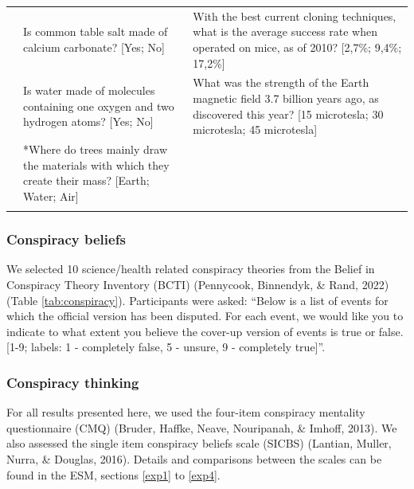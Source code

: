 \documentclass[
  doc,floatsintext]{apa6}
\begin{document}
\begin{longtable}[t]{>{\raggedleft\arraybackslash}p{2em}>{\raggedright\arraybackslash}p{22em}>{\raggedright\arraybackslash}p{22em}}
9 & Is common table salt made of calcium carbonate? [Yes; No] & With the best current cloning techniques, what is the average success rate when operated on mice, as of 2010? [2,7\%; 9,4\%; 17,2\%]\\
10 & Is water made of molecules containing one oxygen and two hydrogen atoms? [Yes; No] & What was the strength of the Earth magnetic field 3.7 billion years ago, as discovered this year? [15 microtesla; 30 microtesla; 45 microtesla]\\
\addlinespace
11 & *Where do trees mainly draw the materials with which they create their mass? [Earth; Water; Air] & \\
\bottomrule
\multicolumn{3}{l}{\rule{0pt}{1em}\textsuperscript{*} Only used in Study 1}\\
\end{longtable}
\endgroup{}

\subsubsection{Conspiracy beliefs}\label{conspiracy-beliefs}

We selected 10 science/health related conspiracy theories from the Belief in Conspiracy Theory Inventory (BCTI) (Pennycook, Binnendyk, \& Rand, 2022) (Table \ref{tab:conspiracy}). Participants were asked: ``Below is a list of events for which the official version has been disputed. For each event, we would like you to indicate to what extent you believe the cover-up version of events is true or false. {[}1-9; labels: 1 - completely false, 5 - unsure, 9 - completely true{]}''.

\subsubsection{Conspiracy thinking}\label{conspiracy-thinking}

For all results presented here, we used the four-item conspiracy mentality questionnaire (CMQ) (Bruder, Haffke, Neave, Nouripanah, \& Imhoff, 2013). We also assessed the single item conspiracy beliefs scale (SICBS) (Lantian, Muller, Nurra, \& Douglas, 2016). Details and comparisons between the scales can be found in the ESM, sections \ref{exp1} to \ref{exp4}.

\begingroup\fontsize{8}{10}\selectfont
\end{document}
